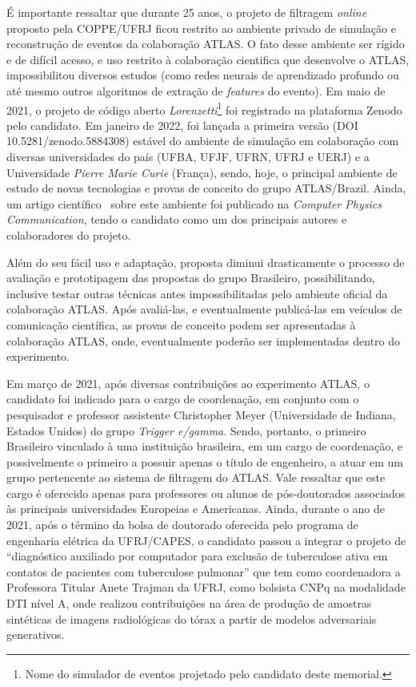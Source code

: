 É importante ressaltar que durante 25 anos, o projeto de filtragem \emph{online} proposto pela COPPE/UFRJ 
ficou restrito ao ambiente privado de simulação e reconstrução de eventos da colaboração ATLAS. 
O fato desse ambiente ser rígido e de difícil acesso, e uso restrito à colaboração cientifica que 
desenvolve o ATLAS, impossibilitou diversos estudos (como redes neurais de aprendizado profundo 
ou até mesmo outros algoritmos de extração de \emph{features} do evento). Em maio de 2021, o projeto de 
código aberto \emph{Lorenzetti}\footnote{Nome do simulador de eventos projetado pelo candidato deste memorial.} 
foi registrado na plataforma Zenodo pelo candidato. Em janeiro de 2022, foi lançada a primeira 
versão (DOI 10.5281/zenodo.5884308) estável do ambiente de simulação em colaboração com diversas 
universidades do país (UFBA, UFJF, UFRN, UFRJ e UERJ) e a Universidade \emph{Pierre Marie Curie} (França), 
sendo, hoje, o principal ambiente de estudo de novas tecnologias e provas de conceito do grupo ATLAS/Brazil. Ainda, um artigo científico~\cite{Araujo:2023uwq} sobre este ambiente foi publicado na
\emph{Computer Physics Communication}, tendo o candidato 
como um dos principais autores e colaboradores do projeto.


Além do seu fácil uso e adaptação, proposta diminui drasticamente o processo de avaliação e prototipagem 
das propostas do grupo Brasileiro, possibilitando, inclusive testar outras técnicas antes impossibilitadas 
pelo ambiente oficial da colaboração ATLAS. Após avaliá-las, e eventualmente publicá-las em veículos de 
comunicação científica, as provas de conceito podem ser apresentadas à colaboração ATLAS, onde, eventualmente 
poderão ser implementadas dentro do experimento.


Em março de 2021, após diversas contribuições ao experimento ATLAS, o candidato foi indicado para o cargo de 
coordenação, em conjunto com o pesquisador e professor assistente Christopher Meyer (Universidade de 
Indiana, Estados Unidos) do grupo \emph{Trigger e/gamma}. Sendo, portanto, o primeiro Brasileiro vinculado à uma 
instituição brasileira, em um cargo 
de coordenação, e possivelmente o primeiro a possuir apenas o título de engenheiro, a atuar em um 
grupo pertencente ao sistema de filtragem do ATLAS. Vale ressaltar que este cargo é oferecido apenas para 
professores ou alunos de pós-doutorados associados às principais universidades Europeias e Americanas. 
Ainda, durante o ano de 2021, após o término da bolsa de doutorado oferecida pelo programa de engenharia 
elétrica da UFRJ/CAPES, o candidato passou a integrar o projeto de “diagnóstico auxiliado por computador 
para exclusão de tuberculose ativa em contatos de pacientes com tuberculose pulmonar” que tem como 
coordenadora a Professora Titular Anete Trajman da UFRJ, como bolsista CNPq na modalidade DTI nível A, onde 
realizou contribuições na área de produção de amostras sintéticas de imagens radiológicas do tórax a partir 
de modelos adversariais generativos.



